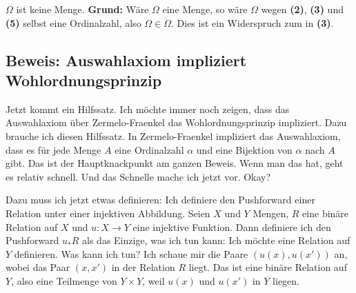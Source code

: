 \begin{math-stroke}

\begin{remark}
$\Omega$ ist keine Menge.
\textbf{Grund:} Wäre $\Omega$ eine Menge, so wäre $\Omega$ wegen \textbf{(2)}, \textbf{(3)} und \textbf{(5)} selbst eine Ordinalzahl, also $\Omega \in \Omega$. Dies ist ein Widerspruch zum  in \textbf{(3)}.
\end{remark}
\end{math-stroke}

\subsection{Beweis: Auswahlaxiom impliziert Wohlordnungsprinzip}

\begin{spoken-clean}[00:39:25 - 00:40:50]
Jetzt kommt ein Hilfssatz. Ich möchte immer noch zeigen, dass das Auswahlaxiom über Zermelo-Fraenkel das Wohlordnungsprinzip impliziert. Dazu brauche ich diesen Hilfssatz. In Zermelo-Fraenkel impliziert das Auswahlaxiom, dass es für jede Menge $A$ eine Ordinalzahl $\alpha$ und eine Bijektion von $\alpha$ nach $A$ gibt. Das ist der Hauptknackpunkt am ganzen Beweis. Wenn man das hat, geht es relativ schnell. Und das Schnelle mache ich jetzt vor. Okay?

Dazu muss ich jetzt etwas definieren: Ich definiere den Pushforward einer Relation unter einer injektiven Abbildung. Seien $X$ und $Y$ Mengen, $R$ eine binäre Relation auf $X$ und $u: X \to Y$ eine injektive Funktion. Dann definiere ich den Pushforward $u_* R$ als das Einzige, was ich tun kann: Ich möchte eine Relation auf $Y$ definieren. Was kann ich tun? Ich schaue mir die Paare $(u(x), u(x'))$ an, wobei das Paar $(x, x')$ in der Relation $R$ liegt. Das ist eine binäre Relation auf $Y$, also eine Teilmenge von $Y \times Y$, weil $u(x)$ und $u(x')$ in $Y$ liegen.
\end{spoken-clean}

